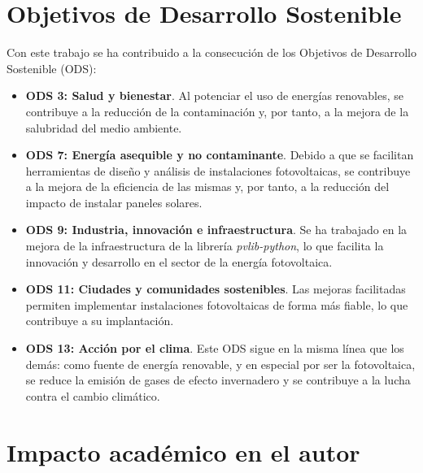 
\section{Objetivos de Desarrollo Sostenible} \label{sct:impacto:ods}

Con este trabajo se ha contribuido a la consecución de los Objetivos de Desarrollo Sostenible (ODS):

\begin{itemize}
  \item \textbf{ODS 3: Salud y bienestar}. Al potenciar el uso de energías renovables, se contribuye a la reducción de la contaminación y, por tanto, a la mejora de la salubridad del medio ambiente.
  \item \textbf{ODS 7: Energía asequible y no contaminante}. Debido a que se facilitan herramientas de diseño y análisis de instalaciones fotovoltaicas, se contribuye a la mejora de la eficiencia de las mismas y, por tanto, a la reducción del impacto de instalar paneles solares.
  \item \textbf{ODS 9: Industria, innovación e infraestructura}. Se ha trabajado en la mejora de la infraestructura de la librería \textit{pvlib-python}, lo que facilita la innovación y desarrollo en el sector de la energía fotovoltaica.
  \item \textbf{ODS 11: Ciudades y comunidades sostenibles}. Las mejoras facilitadas permiten implementar instalaciones fotovoltaicas de forma más fiable, lo que contribuye a su implantación.
  \item \textbf{ODS 13: Acción por el clima}. Este ODS sigue en la misma línea que los demás: como fuente de energía renovable, y en especial por ser la fotovoltaica, se reduce la emisión de gases de efecto invernadero y se contribuye a la lucha contra el cambio climático.
\end{itemize}


\section{Impacto académico en el autor} \label{sct:impacto:personal}

